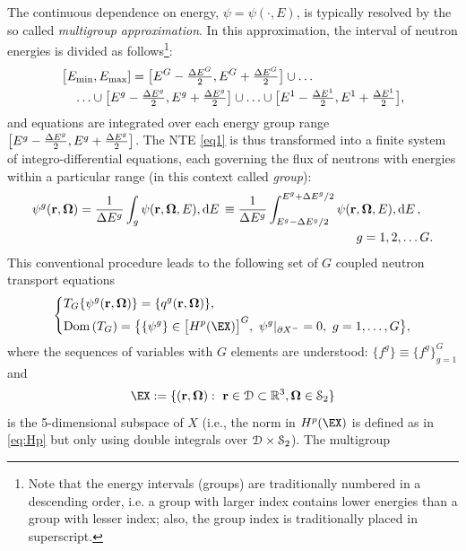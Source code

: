 The continuous dependence on energy, $\psi = \psi(\cdot, E)$, is typically resolved by the so called \textit{multigroup
approximation}. In this approximation, the interval of neutron energies is divided as follows\footnote{Note that the
energy intervals (groups) are traditionally numbered in a descending order, i.e. a group with larger index contains
lower energies than a group with lesser index; also, the group index is traditionally placed in superscript.}:
$$
\begin{multlined}
  \bigl[\Emin,\Emax] = \bigl[E^{G}-\dEh{G},E^{G}+\dEh{G}\bigr]\cup \ldots\\
  \ldots \cup \bigl[E^{g}-\dEh{g}, E^{g}+\dEh{g}\bigr] \cup \ldots \cup
  \bigl[E^1-\dEh{1},E^{1}+\dEh{1}\bigr],
\end{multlined} 
$$
and equations  are integrated over each energy group range 
\linebreak
\mbox{$\bigl[E^{g}-\tfrac{\Delta E^{g}}{2}, E^{g}+\tfrac{\Delta E^{g}}{2}\bigr]$}.
The NTE \eqref{eq1} is thus transformed into a finite system of integro-differential
equations, each governing the flux of neutrons with energies within a particular range (in this context called
\textit{group}):
\begin{equation}\label{eq:psi-MG}
\begin{multlined}
  \psi^g(\br, \bomega) = \frac{1}{\Delta E^{g}}\int_{g}\psi(\br, \bomega, E),\d{E} \equiv
  \frac{1}{\Delta E^{g}}\int_{E^g-\Delta E^{g}/2}^{E^g+\Delta E^{g}/2}\psi(\br, \bomega, E),\d{E},\\ g = 1, 2,\ldots
  G.
\end{multlined}
\end{equation} 
This conventional procedure leads to the following set of $G$ coupled neutron transport equations
\begin{equation}\label{eq:mg}
	\left\{
	  \begin{aligned}
      &T_G\{\psi^g(\br,\bomega)\} = \{q^g(\br,\bomega)\},\\
      &\Dom{T_G} = \bigl\{\{\psi^g\}\in \bigl[\Hp(\EX)\bigr]^G,\ \psi^g\vert_{\pX[-]} = 0,\ g = 1,\ldots,G\bigr\},
    \end{aligned}
  \right.\\[.2em]
\end{equation}
where the sequences of variables with $G$ elements are understood: $\{f^g\} \equiv \{f^g\}_{g=1}^G$ and 
$$
	\EX := \{(\br,\bomega):\ \br\in \VV\subset\R[3], \bomega\in \Sphere\}
$$
is the 5-dimensional subspace of $X$ (i.e., the norm in $\Hp(\EX)$ is defined as
in \eqref{eq:Hp} but only using double integrals over $\mathcal{D}\times\mathcal{S}_2$). The multigroup
